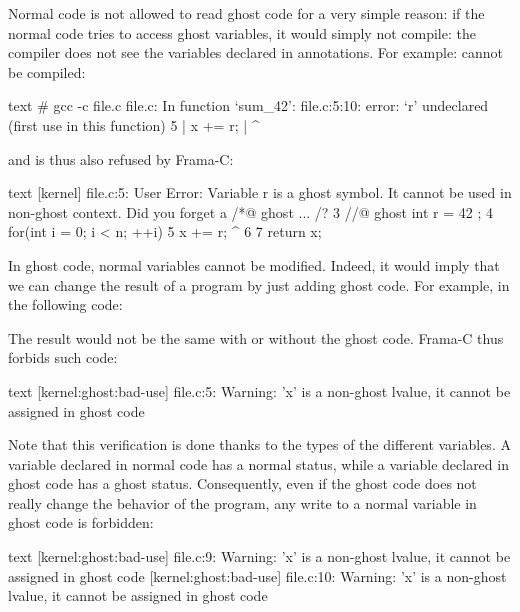 Normal code is not allowed to read ghost code for a very simple reason:
if the normal code tries to access ghost variables,
it would simply not compile: the compiler does not see the variables
declared in annotations. For example:
cannot be compiled:
\begin{CodeBlock}{text}
# gcc -c file.c
file.c: In function ‘sum_42’:
file.c:5:10: error: ‘r’ undeclared (first use in this function)
    5 |     x += r;
      |          ^
\end{CodeBlock}
and is thus also refused by Frama-C:
\begin{CodeBlock}{text}
[kernel] file.c:5: User Error:
Variable r is a ghost symbol. It cannot be used in non-ghost context. Did you forget a /*@ ghost ... /?
  3       //@ ghost int r = 42 ;
  4       for(int i = 0; i < n; ++i){
  5         x += r;
                 ^
  6       }
  7       return x;
\end{CodeBlock}


In ghost code, normal variables cannot be modified. Indeed, it
would imply that we can change the result of a program by just
adding ghost code. For example, in the following code:




The result would not be the same with or without the ghost code.
Frama-C thus forbids such code:


\begin{CodeBlock}{text}
[kernel:ghost:bad-use] file.c:5: Warning:
  'x' is a non-ghost lvalue, it cannot be assigned in ghost code
\end{CodeBlock}


Note that this verification is done thanks to the types of the different
variables. A variable declared in normal code has a normal status, while
a variable declared in ghost code has a ghost status. Consequently, even
if the ghost code does not really change the behavior of the program, any
write to a normal variable in ghost code is forbidden:




\begin{CodeBlock}{text}
[kernel:ghost:bad-use] file.c:9: Warning:
  'x' is a non-ghost lvalue, it cannot be assigned in ghost code
[kernel:ghost:bad-use] file.c:10: Warning:
  'x' is a non-ghost lvalue, it cannot be assigned in ghost code
\end{CodeBlock}


